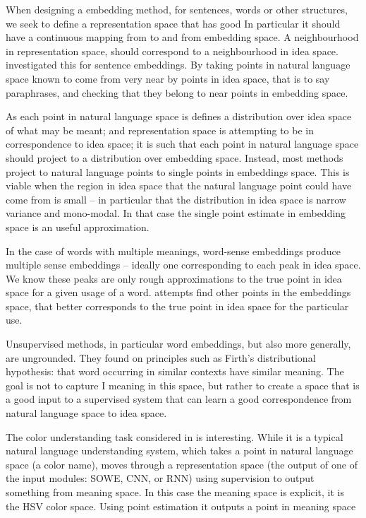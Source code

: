 \documentclass{book}
\begin{document}
When designing a embedding method, for sentences, words or other structures,
we seek to define a representation space
that has good 
In particular it should have a continuous mapping from to and from embedding space.
A neighbourhood in representation space, should correspond to a neighbourhood in idea space.
 investigated this for sentence embeddings.
By taking points in natural language space known to come from very near by points in idea space, that is to say paraphrases,
and checking that they belong to near points in embedding space.


As each point in natural language space is defines a distribution over idea space of what may be meant;
and representation space is attempting to be in correspondence to idea space;
it is such that each point in natural language space should project to a distribution over embedding space.
Instead, most methods project to natural language points to single points in embeddings space.
This is viable when the region in idea space that the natural language point could have come from is small -- in particular that the distribution in idea space is narrow variance and mono-modal.
In that case the single point estimate in embedding space is an useful approximation.


In the case of words with multiple meanings, 
word-sense embeddings produce multiple sense embeddings -- ideally one corresponding to each peak in idea space.
We know these peaks are only rough approximations to the true point in idea space for a given usage of a word.
 attempts find other points in the embeddings space, that better corresponds to the true point in idea space for the particular use.


Unsupervised methods, in particular word embeddings, but also more generally, are ungrounded.
They found on principles such as Firth's distributional hypothesis:
that word occurring in similar contexts have similar meaning. 
The goal is not to capture I meaning in this space,
but rather to create a space that is a good input to a supervised system that can learn a good correspondence from natural language space to idea space. 

The color understanding task considered in  is interesting.
While it is a typical natural language understanding system,
which takes a point in natural language space (a color name),
moves through a representation space (the output of one of the input modules: SOWE, CNN, or RNN) using supervision to output something from meaning space.
In this case the meaning space is explicit, it is the HSV color space.
Using point estimation it outputs a point in meaning space













\printbib
\end{document}
